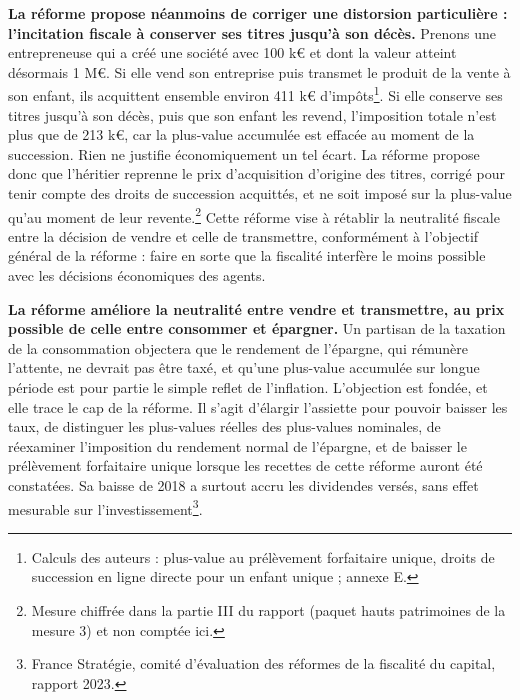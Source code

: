 \documentclass[10pt,a4paper]{article}
\begin{document}
\textbf{La réforme propose néanmoins de corriger une distorsion particulière : l’incitation fiscale à conserver ses titres jusqu’à son décès.} Prenons une entrepreneuse qui a créé une société avec 100 k€ et dont la valeur atteint désormais 1 M€. Si elle vend son entreprise puis transmet le produit de la vente à son enfant, ils acquittent ensemble environ 411 k€ d’impôts\footnote{Calculs des auteurs : plus-value au prélèvement forfaitaire unique, droits de succession en ligne directe pour un enfant unique ; annexe E.}. Si elle conserve ses titres jusqu’à son décès, puis que son enfant les revend, l’imposition totale n’est plus que de 213 k€, car la plus-value accumulée est effacée au moment de la succession. Rien ne justifie économiquement un tel écart. La réforme propose donc que l’héritier reprenne le prix d’acquisition d’origine des titres, corrigé pour tenir compte des droits de succession acquittés, et ne soit imposé sur la plus-value qu’au moment de leur revente.\footnote{Mesure chiffrée dans la partie III du rapport (paquet hauts patrimoines de la mesure 3) et non comptée ici.} Cette réforme vise à rétablir la neutralité fiscale entre la décision de vendre et celle de transmettre, conformément à l’objectif général de la réforme : faire en sorte que la fiscalité interfère le moins possible avec les décisions économiques des agents.

\textbf{La réforme améliore la neutralité entre vendre et transmettre, au prix possible de celle entre consommer et
épargner.} Un partisan de la taxation de la consommation objectera que le rendement de l'épargne, qui rémunère
l'attente, ne devrait pas être taxé, et qu'une plus-value accumulée sur longue période est pour partie le simple
reflet de l'inflation. L'objection est fondée, et elle trace le cap de la réforme. Il s'agit d'élargir l'assiette pour pouvoir
baisser les taux, de distinguer les plus-values réelles des plus-values nominales, de réexaminer l'imposition du
rendement normal de l'épargne, et de baisser le prélèvement forfaitaire unique lorsque les recettes de cette réforme
auront été constatées. Sa baisse de 2018 a surtout accru les dividendes versés, sans effet mesurable sur
l'investissement\footnote{France Stratégie, comité d'évaluation des réformes de la fiscalité du capital, rapport 2023.}.
\end{document}
